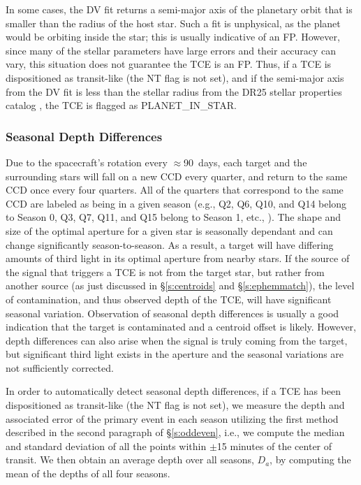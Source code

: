 In some cases, the DV fit returns a semi-major axis of the planetary orbit that is smaller than the radius of the host star. Such a fit is unphysical, as the planet would be orbiting inside the star; this is usually indicative of an FP. However, since many of the stellar parameters have large errors and their accuracy can vary, this situation does not guarantee the TCE is an FP. Thus, if a TCE is dispositioned as transit-like (the NT flag is not set), and if the semi-major axis from the DV fit is less than the stellar radius from the DR25 stellar properties catalog \citep{Mathur2017ApJS}, the TCE is flagged as PLANET\_IN\_STAR.


\subsubsection{Seasonal Depth Differences}
\label{s:seasonaldiff}

Due to the \kepler{} spacecraft's rotation every $\approx$90~days, each target and the surrounding stars will fall on a new CCD every quarter, and return to the same CCD once every four quarters. All of the quarters that correspond to the same CCD are labeled as being in a given season (e.g., Q2, Q6, Q10, and Q14 belong to Season 0, Q3, Q7, Q11, and Q15 belong to Season 1, etc., \citealt{Thompson2016KAM}). The shape and size of the optimal aperture for a given star is seasonally dependant and can change significantly season-to-season. As a result, a target will have differing amounts of third light in its optimal aperture from nearby stars. If the source of the signal that triggers a TCE is not from the target star, but rather from another source (as just discussed in \S\ref{s:centroids} and \S\ref{s:ephemmatch}), the level of contamination, and thus observed depth of the TCE, will have significant seasonal variation. Observation of seasonal depth differences is usually a good indication that the target is contaminated and a centroid offset is likely. However, depth differences can also arise when the signal is truly coming from the target, but significant third light exists in the aperture and the seasonal variations are not sufficiently corrected.

In order to automatically detect seasonal depth differences, if a TCE has been dispositioned as transit-like (the NT flag is not set), we measure the depth and associated error of the primary event in each season utilizing the first method described in the second paragraph of \S\ref{s:oddeven}, i.e., we compute the median and standard deviation of all the points within $\pm$15 minutes of the center of transit. We then obtain an average depth over all seasons, $D_{a}$, by computing the mean of the depths of all four seasons. 

